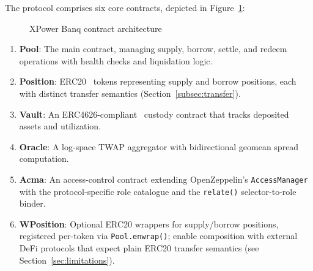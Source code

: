 \documentclass[10pt,a4paper,twocolumn]{article}
\begin{document}
The protocol comprises six core contracts, depicted in Figure~\ref{fig:architecture}:

\begin{figure}[htbp]
\centering
{}
\caption{XPower Banq contract architecture}
\label{fig:architecture}
\end{figure}

\begin{enumerate}[leftmargin=*]
    \item \textbf{Pool}: The main contract, managing supply, borrow, settle, and redeem operations with health checks and liquidation logic.

    \item \textbf{Position}: ERC20~\cite{erc20} tokens representing supply and borrow positions, each with distinct transfer semantics (Section~\ref{subsec:transfer}).

    \item \textbf{Vault}: An ERC4626-compliant~\cite{erc4626} custody contract that tracks deposited assets and utilization.

    \item \textbf{Oracle}: A log-space TWAP aggregator with bidirectional geomean spread computation.

    \item \textbf{Acma}: An access-control contract extending OpenZeppelin's \texttt{AccessManager}~\cite{openzeppelin2020} with the protocol-specific role catalogue and the \texttt{relate()} selector-to-role binder.

    \item \textbf{WPosition}: Optional ERC20 wrappers for supply/borrow positions, registered per-token via \texttt{Pool.enwrap()}; enable composition with external DeFi protocols that expect plain ERC20 transfer semantics (see Section~\ref{sec:limitations}).
\end{enumerate}
\end{document}
